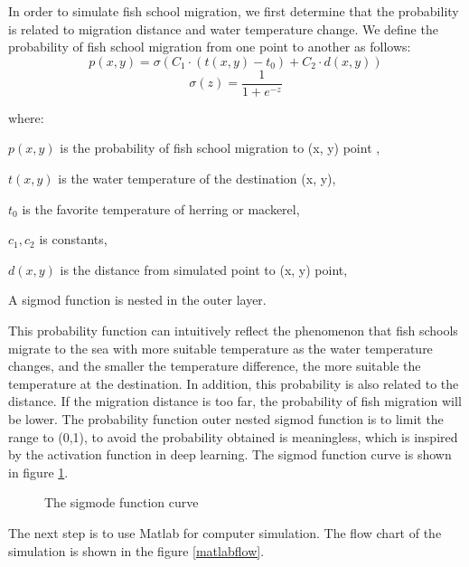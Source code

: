 \documentclass{mcmthesis}
\numberwithin{figure}{section}
\numberwithin{table}{section}
\begin{document}
In order to simulate fish school migration, we first determine that the probability is related to migration distance and water temperature change. We define the probability of fish school migration from one point to another as follows:
\begin{equation}\label{3}
      p(x,y) = \sigma (C_1 \cdot (t(x,y)-t_0)+C_2 \cdot d(x,y))
    \end{equation}
  \begin{equation}\label{4}
    \sigma (z) = \frac{1}{1+e^{-z}}
  \end{equation}
 
  where:
  
  $p(x,y)$ is the probability of fish school migration to (x, y) point ,
  
  $t(x,y)$ is the water temperature of the destination (x, y), 
  
  $t_0$ is the favorite temperature of herring or mackerel,
  
  $c_1,c_2$ is constants, 
  
  $d(x,y)$ is the distance from simulated point to (x, y) point, 
  
  A sigmod function is nested in the outer layer.
  
  This probability function can intuitively reflect the phenomenon that fish schools migrate to the sea with more suitable temperature as the water temperature changes, and the smaller the temperature difference, the more suitable the temperature at the destination. In addition, this probability is also related to the distance. If the migration distance is too far, the probability of fish migration will be lower. The probability function outer nested sigmod function is to limit the range to (0,1), to avoid the probability obtained is meaningless, which is inspired by the activation function in deep learning. The sigmod function curve is shown in figure \ref{sigmodcurve}.

  \begin{figure}[H]
    \caption{The sigmode function curve}\label{sigmodcurve}
  \end{figure}
The next step is to use Matlab for computer simulation. The flow chart of the simulation is shown in the figure \ref{matlabflow}.
\end{document}
